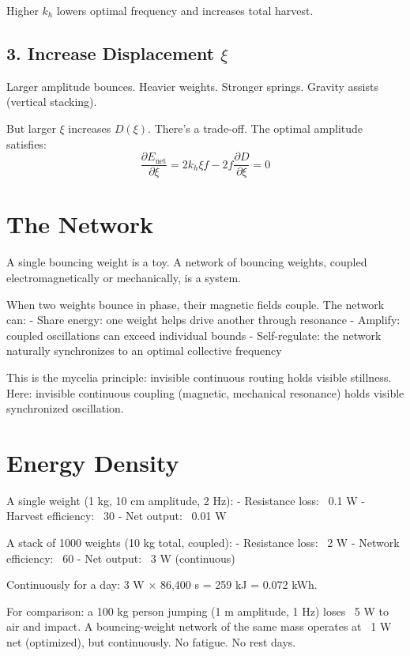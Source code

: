 \documentclass[12pt]{article}
\begin{document}
Higher $k_h$ lowers optimal frequency and increases total harvest.

\subsection{3. Increase Displacement $\xi$}

Larger amplitude bounces. Heavier weights. Stronger springs. Gravity assists (vertical stacking).

But larger $\xi$ increases $D(\xi)$. There's a trade-off. The optimal amplitude satisfies:
\[
\frac{\partial E_{\text{net}}}{\partial \xi} = 2k_h \xi f - 2f \frac{\partial D}{\partial \xi} = 0
\]

\section{The Network}

A single bouncing weight is a toy. A network of bouncing weights, coupled electromagnetically or mechanically, is a system.

When two weights bounce in phase, their magnetic fields couple. The network can:
- Share energy: one weight helps drive another through resonance
- Amplify: coupled oscillations can exceed individual bounds
- Self-regulate: the network naturally synchronizes to an optimal collective frequency

This is the mycelia principle: invisible continuous routing holds visible stillness. Here: invisible continuous coupling (magnetic, mechanical resonance) holds visible synchronized oscillation.

\section{Energy Density}

A single weight (1 kg, 10 cm amplitude, 2 Hz):
- Resistance loss: ~0.1 W
- Harvest efficiency: ~30%
- Net output: ~0.01 W

A stack of 1000 weights (10 kg total, coupled):
- Resistance loss: ~2 W
- Network efficiency: ~60%
- Net output: ~3 W (continuous)

Continuously for a day: 3 W × 86,400 s = 259 kJ = 0.072 kWh.

For comparison: a 100 kg person jumping (1 m amplitude, 1 Hz) loses ~5 W to air and impact. A bouncing-weight network of the same mass operates at ~1 W net (optimized), but continuously. No fatigue. No rest days.
\end{document}
